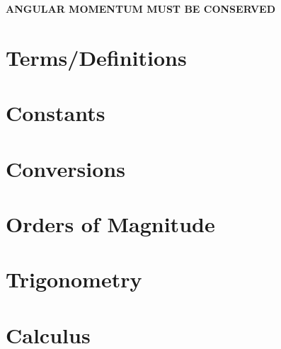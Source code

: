 \documentclass[letterpaper,10pt]{article}
\begin{document}
\begin{multicols}{2}
\medskip
\begin{center}
    \textbf{ANGULAR MOMENTUM MUST BE CONSERVED}
\end{center}

\appendix
\section{Terms/Definitions}

\section{Constants}

\section{Conversions}

\section{Orders of Magnitude}

\section{Trigonometry}

\section{Calculus}

\end{multicols}
\end{document}
